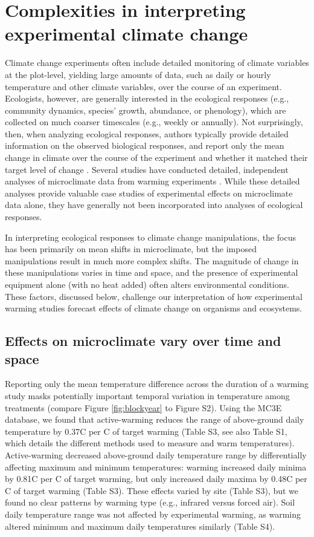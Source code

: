\documentclass{article}
\begin{document}
\section* {Complexities in interpreting experimental climate change} 
Climate change experiments often include detailed monitoring of climate variables at the plot-level, yielding large amounts of data, such as daily or hourly temperature and other climate variables, over the course of an experiment. Ecologists, however, are generally interested in the ecological responses (e.g., community dynamics, species' growth, abundance, or phenology), which are collected on much coarser timescales (e.g., weekly or annually). Not surprisingly, then, when analyzing ecological responses, authors typically provide detailed information on the observed biological responses, and report only the mean change in climate over the course of the experiment and whether it matched their target level of change \citep[e.g.,][]{price1998,rollinson2012,clark2014a,clark2014b}. Several studies have conducted detailed, independent analyses of microclimate data from warming experiments \citep[e.g.,][]{harte1995b,kimball2005,kimball2008,mcdaniel2014, pelini2011}. While these detailed analyses provide valuable case studies of experimental effects on microclimate data alone, they have generally not been incorporated into analyses of ecological responses. 

\par In interpreting ecological responses to climate change manipulations, the focus has been primarily on mean shifts in microclimate, but the imposed manipulations result in much more complex shifts. The magnitude of change in these manipulations varies in time and space, and the presence of experimental equipment alone (with no heat added) often alters environmental conditions.  These factors, discussed below, challenge our interpretation of how experimental warming studies forecast effects of climate change on organisms and ecosystems.

\subsection* {Effects on microclimate vary over time and space}
Reporting only the mean temperature difference across the duration of a warming study masks potentially important temporal variation in temperature among treatments (compare Figure \ref{fig:blockyear} to Figure S2). Using the MC3E database, we found that active-warming reduces the range of above-ground daily temperature by 0.37\degree C per \degree C of target warming (Table S3, see also Table S1, which details the different methods used to measure and warm temperatures). Active-warming decreased above-ground daily temperature range by differentially affecting maximum and minimum temperatures: warming increased daily minima by 0.81\degree C per \degree C of target warming, but only increased daily maxima by 0.48\degree C per \degree C of target warming (Table S3). These effects varied by site (Table S3), but we found no clear patterns by warming type (e.g., infrared versus forced air). Soil daily temperature range was not affected by experimental warming, as warming altered minimum and maximum daily temperatures similarly (Table S4).
\end{document}

